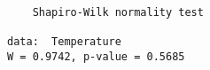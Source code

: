 \begin{verbatim} 

	Shapiro-Wilk normality test

data:  Temperature
W = 0.9742, p-value = 0.5685

\end{verbatim}